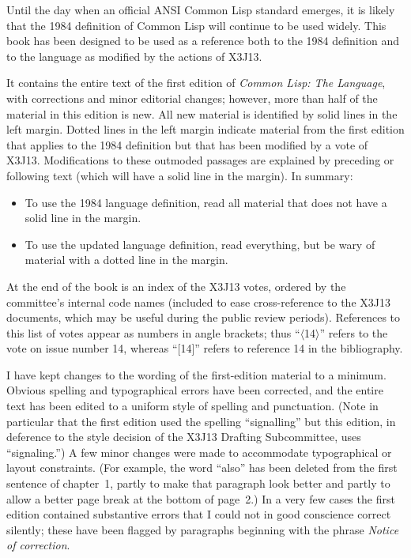 Until the day when an official ANSI Common Lisp standard emerges,
it is likely that the 1984 definition of Common Lisp will
continue to be used widely.  This book has been designed
to be used as a reference both to the 1984 definition
and to the language as modified by the actions of X3J13.

It contains the entire text of the first edition
of {\it Common Lisp: The Language}, with corrections
and minor editorial changes;
however, more than half of the material in this edition is new.
All new material is
identified by solid lines
in the left margin.
Dotted lines in the left margin indicate material from the first edition
that applies to the 1984 definition but that has been modified
by a vote of X3J13.  Modifications to these outmoded
passages are explained by preceding or following text (which will
have a solid line in the margin).
In summary:
\begin{itemize}
\item To use the 1984 language definition, read all material that does not
have a solid line in the margin.
\item To use the updated language definition, read everything, but
be wary of material with a dotted line in the margin.
\end{itemize}

At the end of the book is an index of the X3J13 votes, ordered
by the committee's internal code names (included to ease cross-reference
to the X3J13 documents, which may be useful during the public review
periods).  References to this list of votes appear as numbers
in angle brackets; thus
``$\langle$14$\rangle$'' refers to the vote on issue number 14, whereas
``[14]'' refers to reference 14 in the bibliography.

I have kept changes to the wording of the first-edition material to a minimum.
Obvious spelling and typographical errors have been corrected,
and the entire text has been edited to a uniform style of
spelling and punctuation.  (Note in particular that the first edition
used the spelling ``signalling'' but this edition,
in deference to the style decision of the X3J13 Drafting
Subcommittee, uses ``signaling.'')  A few minor
changes were made to accommodate typographical or layout constraints.
(For example, the word ``also'' has been deleted from the first
sentence of chapter~1, partly to make that paragraph look better
and partly to allow a better page break at the bottom of page~2.)
In a very few cases the first edition contained substantive errors
that I could not in good conscience correct silently; these have
been flagged by paragraphs beginning with the phrase
{\it Notice of correction}.

